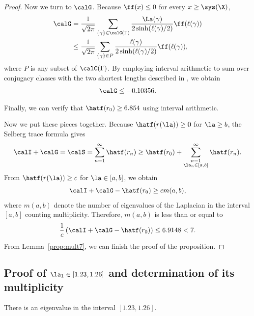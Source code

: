 \begin{proof}
Now we turn to $\calG$.
Because $\ff(x)\leq 0$ for every $x \geq \sys(\X)$,
\begin{align*}
\calG & = \frac{1}{\sqrt{2\pi}}\sum_{\{\gamma\} \in \calC(\Gamma)} \frac{\La(\gamma)}{2 \sinh(\ell(\gamma)/2)} \ff(\ell(\gamma)) \\
& \leq \frac{1}{\sqrt{2\pi}}\sum_{\{\gamma\} \in P} \frac{\ell(\gamma)}{2\sinh(\ell(\gamma)/2)} \ff(\ell(\gamma)),
\end{align*}
where $P$ is any subset of $\calC(\Gamma)$.
By employing interval arithmetic to sum over conjugacy classes with the two shortest lengths described in , we obtain
\[
\calG \leq -0.10356.
\]

Finally, we can verify that $\hatf(r_0)\geq 6.854$ using interval arithmetic.

Now we put these pieces together.
Because $\hatf(r(\la))\geq 0$ for $\la \geq b$, the Selberg trace formula gives
\[
\calI+\calG = \calS  =  \sum_{n=1}^{\infty}\hatf(r_n)
\geq \hatf(r_0)+ \sum_{\substack{n=1 \\ \la_n\in [a,b]}}^{\infty}
\hatf(r_n).
\]
From $\hatf(r(\la))\geq c$ for $\la\in [a,b]$, 
we obtain
\[
\calI+\calG - \hatf(r_0)  \geq  c m(a,b),
\]
where $m(a,b)$ denote the number of eigenvalues of the Laplacian in the interval $[a,b]$ counting multiplicity.
Therefore, $m(a,b)$ is less than or equal to
\[
\frac{1}{c}\left(\calI+\calG - \hatf(r_0) \right) \leq 6.9148<7.
\]
From Lemma~\ref{prop:mult7}, we can finish the proof of the proposition.
\end{proof}


\subsection{Proof of $\la_1\in [1.23, 1.26]$ and determination of its multiplicity}\label{subsec:subinterval4}
\begin{prop}\label{prop:subinterval4}
There is an eigenvalue in the interval $[1.23, 1.26]$.
\end{prop}

